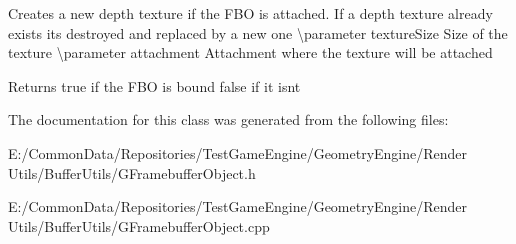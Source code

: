Creates a new depth texture if the F\+BO is attached. If a depth texture already exists it\textquotesingle{}s destroyed and replaced by a new one \textbackslash{}parameter texture\+Size Size of the texture \textbackslash{}parameter attachment Attachment where the texture will be attached \begin{DoxyReturn}{Returns}
true if the F\+BO is bound false if it isn\textquotesingle{}t 
\end{DoxyReturn}


The documentation for this class was generated from the following files\+:\begin{DoxyCompactItemize}
\item 
E\+:/\+Common\+Data/\+Repositories/\+Test\+Game\+Engine/\+Geometry\+Engine/\+Render Utils/\+Buffer\+Utils/G\+Framebuffer\+Object.\+h\item 
E\+:/\+Common\+Data/\+Repositories/\+Test\+Game\+Engine/\+Geometry\+Engine/\+Render Utils/\+Buffer\+Utils/G\+Framebuffer\+Object.\+cpp\end{DoxyCompactItemize}
